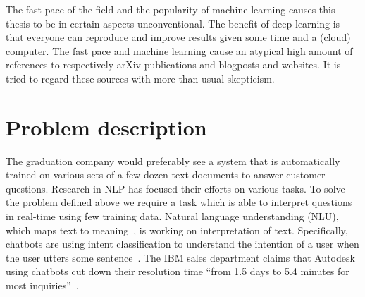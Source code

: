 The fast pace of the field and the popularity of machine learning causes this thesis to be in certain aspects unconventional.
The benefit of deep learning is that everyone can reproduce and improve results given some time and a (cloud) computer.
The fast pace and machine learning cause an atypical high amount of references to respectively arXiv publications and blogposts and websites.
It is tried to regard these sources with more than usual skepticism.

\section{Problem description}
\label{sec:problem_description}
The graduation company would preferably see a system that is automatically trained on various sets of a few dozen text documents to answer customer questions.
Research in NLP has focused their efforts on various tasks.
To solve the problem defined above we require a task which is able to interpret questions in real-time using few training data.
Natural language understanding (NLU), which maps text to meaning~\citep{jurafsky2014speech}, is working on interpretation of text.
Specifically, chatbots are using intent classification to understand the intention of a user when the user utters some sentence~\citep{bocklisch2017rasa,burtsev2018,zhou2018design}.
The IBM sales department claims that Autodesk using chatbots cut down their resolution time ``from 1.5 days to 5.4 minutes for most inquiries''~\citep{ibm2018autodesk}.

